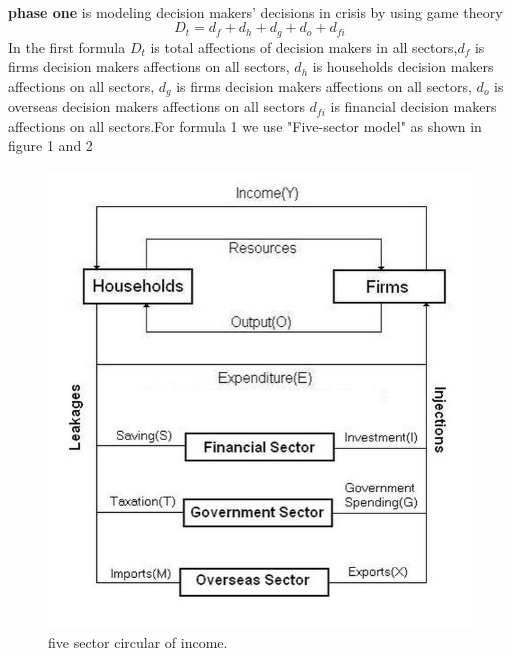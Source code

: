 \documentclass{article}
\begin{document}
\\\textbf{phase one} is modeling decision makers' decisions in crisis by using game theory 
\begin{equation}
  D_{t} = d_{f} + d_{h} + d_{g} + d_{o} + d_{fi}
\end{equation}
  In the first formula $D_{t}$ is total affections of decision makers in all sectors,$d_{f}$ is  firms decision makers affections on all sectors, $d_{h}$ is households decision makers affections on all sectors, $d_{g}$ is firms decision makers affections on all sectors, $d_{o}$ is overseas  decision makers affections on all sectors $d_{fi}$ is financial  decision makers affections on all sectors.For formula 1 we use "Five-sector model" \cite{buultjens2000excel} as shown in figure 1 and 2 
 \begin{figure}
  	\includegraphics[width=\linewidth]{FiveSectorCircularFlowofIncomeModel.jpg}
  	\caption{five sector circular of income.}
  	\label{fig:1}
 \end{figure} 
\end{document}
